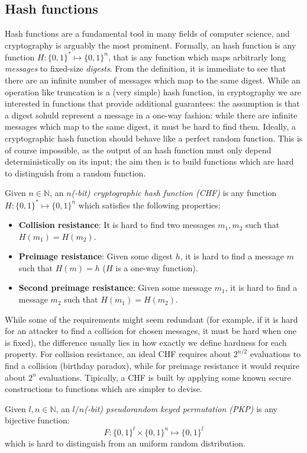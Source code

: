 \subsection{Hash functions}
Hash functions are a fundamental tool in many fields of computer science, and cryptography is
arguably the most prominent.
Formally, an hash function is any function \(H\colon {\{0, 1\}}^{*} \mapsto {\{0, 1\}}^n\), that
is any function which maps arbitrarly long \emph{messages} to fixed-size \emph{digests}.
From the definition, it is immediate to see that there are an infinite number of messages which map
to the same digest.
While an operation like truncation is a (very simple) hash function, in cryptography we are
interested in functions that provide additional guarantees: the assumption is that a digest sohuld
represent a message in a one-way fashion: while there are infinite messages which map to the same
digest, it must be hard to find them.
Ideally, a cryptographic hash function should behave like a perfect random function.
This is of course impossible, as the output of an hash function must only depend deterministically
on its input; the aim then is to build functions which are hard to distinguish from a random
function.
\begin{definition}
	Given \(n \in \mathbb{N}\), an \emph{\(n\)(-bit) cryptographic hash function (CHF)} is any
	function \(H\colon {\{0, 1\}}^{*} \mapsto {\{0, 1\}}^n\) which satisfies the following properties:
	\begin{itemize}
		\item \textbf{Collision resistance}: It is hard to find two messages \(m_1, m_2\) such
		      that \(H(m_1) = H(m_2)\).
		\item \textbf{Preimage resistance}: Given some digest \(h\), it is hard to find a
		      message \(m\) such that \(H(m) = h\) (\(H\) is a one-way function).
		\item \textbf{Second preimage resistance}: Given some message \(m_1\), it is hard to
		      find a message \(m_2\) such that \(H(m_1) = H(m_2)\).
	\end{itemize}
\end{definition}

\noindent While some of the requirements might seem redundant (for example, if it is hard for an
attacker to find a collision for chosen messages, it must be hard when one is fixed),
the difference usually lies in how exactly we define hardness for each property.
For collision resistance, an ideal CHF requires about \(2^{n/2}\) evaluations to find a collision
(birthday paradox), while for preimage resistance it would require about \(2^n\) evaluations.
Tipically, a CHF is built by applying some known secure constructions to functions which are
simpler to devise.
\begin{definition}
	Given \(l, n \in \mathbb{N}\), an \emph{\(l/n\)(-bit) pseudorandom keyed permutation (PKP)} is
	any bijective function:
	\[F\colon {\{0, 1\}}^l \times {\{0, 1\}}^n \mapsto {\{0, 1\}}^l\]
	which is hard to distinguish from an uniform random distribution.
\end{definition}

